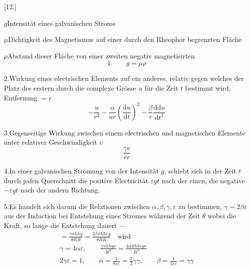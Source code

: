\begin{center}[12.]\end{center}
\noindent$g$\quad Intensität eines galvanischen Stroms\par
\noindent$\mu$\quad Dichtigkeit des Magnetismus auf einer durch den Rheophor begrenzten Fläche\par
\noindent$\rho$\quad Abstand dieser Fläche von einer zweiten negativ magnetisirten
\[
\text{1.}\qquad g=\mu\rho
\]

2.\quad Wirkung eines electrischen Elements auf ein anderes, relativ gegen welches der Platz des erstern durch die complexe Grösse $u$ für die Zeit $t$ bestimmt wird, Entfernung $=r$
\[
-\frac{u}{r^3}-\frac{\alpha}{ur}\left(\frac{\mathrm du}{\mathrm dt}\right)^2-\frac{\beta}{r}\frac{\mathrm d\mathrm du}{\mathrm dt^2}
\]

3.\quad Gegenseitige Wirkung zwischen einem electrischen und magnetischen Elemente unter relativer Geschwindigkeit $v$
\[
\frac{\gamma v}{rr}
\]

4.\quad In einer galvanischen Strömung von der Intensität $g$, schiebt sich in der Zeit $t$ durch jeden Querschnitt die positive Electricität $\varepsilon gt$ nach der einen, die negative $-\varepsilon gt$ nach der andern Richtung.

5.\quad Es handelt sich darum die Relationen zwischen $\alpha,\beta,\gamma,\varepsilon$ zu bestimmen, $\gamma=2\beta\varepsilon$ aus der Induction bei Entstehung eines Stromes während der Zeit $\theta$ wobei die Kraft, so lange die Entstehung dauert —
\[
\begin{gathered}
=\frac{\gamma\pi hhg}{\theta RR}=\frac{2\beta\pi hh\varepsilon g}{\theta RR}\quad\text{wird}\\[6pt]
\gamma=4\alpha\varepsilon,\qquad\frac{\gamma\pi hhgv}{R^3}=\frac{4\alpha\pi hh\varepsilon gv}{R^3}\\[6pt]
2\gamma\varepsilon=1,\qquad\alpha=\frac{1}{8\varepsilon\varepsilon}=\tfrac{1}{2}\gamma\gamma,\qquad\beta=\frac{1}{4\varepsilon\varepsilon}=\gamma\gamma
\end{gathered}
\]

